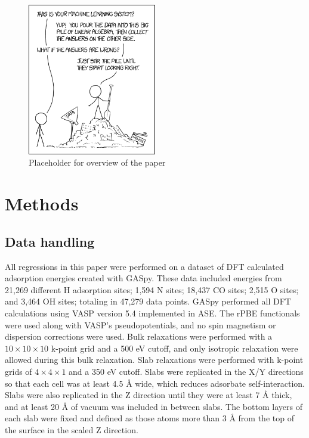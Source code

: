 \documentclass[]{achemso}
\begin{document}
\begin{figure}
    \centering
    \includegraphics[width=0.5\textwidth]{placeholder.png}
    \caption{Placeholder for overview of the paper}\label{fig:overview}
\end{figure}



\section{Methods}

\subsection{Data handling}

All regressions in this paper were performed on a dataset of \gls{DFT} calculated adsorption energies created with \gls{GASpy}\cite{Tran2018, Tran2018a}.
These data included energies from 21,269 different H adsorption sites; 1,594 N sites; 18,437 CO sites; 2,515 O sites; and 3,464 OH sites; totaling in 47,279 data points.
\gls{GASpy} performed all \gls{DFT} calculations using \gls{VASP}\cite{Kresse1993, Kresse1994, Kresse1996, Kresse1996a} version 5.4 implemented in \gls{ASE}\cite{HjorthLarsen2017}.
The \gls{rPBE} functionals\cite{Hammer1999} were used along with \gls{VASP}'s pseudopotentials, and no spin magnetism or dispersion corrections were used.
Bulk relaxations were performed with a $10\times10\times10$ k-point grid and a 500 eV cutoff, and only isotropic relaxation were allowed during this bulk relaxation.
Slab relaxations were performed with k-point grids of $4\times4\times1$ and a 350 eV cutoff.
Slabs were replicated in the X/Y directions so that each cell was at least 4.5 \AA{} wide, which reduces adsorbate self-interaction.
Slabs were also replicated in the Z direction until they were at least 7 \AA{} thick, and at least 20 \AA{} of vacuum was included in between slabs.
The bottom layers of each slab were fixed and defined as those atoms more than 3 \AA{} from the top of the surface in the scaled Z direction.
\end{document}
